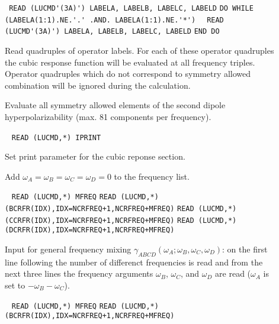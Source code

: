 \begin{description}
\item[] \verb| |\newline
\verb|READ (LUCMD'(3A)') LABELA, LABELB, LABELC, LABELD|\newline
\verb|DO WHILE (LABELA(1:1).NE.'.' .AND. LABELA(1:1).NE.'*')|\newline
\verb|  READ (LUCMD'(3A)') LABELA, LABELB, LABELC, LABELD|\newline
\verb|END DO|

Read quadruples of operator labels.
For each of these operator quadruples the cubic response
function will be evaluated at all frequency triples.
Operator quadruples which do not correspond to symmetry allowed
combination will be ignored during the calculation. 

\item[] 
Evaluate all symmetry allowed elements of the second dipole
hyperpolarizability (max. 81 components per frequency).

\item[] \verb| |\newline
\verb|READ (LUCMD,*) IPRINT|

Set print parameter for the cubic reponse section.

\item[] 
Add $\omega_A = \omega_B = \omega_C = \omega_D = 0$ to the frequency list.

\item[] \verb| |\newline
\verb|READ (LUCMD,*) MFREQ|\newline
\verb|READ (LUCMD,*) (BCRFR(IDX),IDX=NCRFREQ+1,NCRFREQ+MFREQ)|\newline
\verb|READ (LUCMD,*) (CCRFR(IDX),IDX=NCRFREQ+1,NCRFREQ+MFREQ)|\newline
\verb|READ (LUCMD,*) (DCRFR(IDX),IDX=NCRFREQ+1,NCRFREQ+MFREQ)|

Input for general frequency mixing
$\gamma_{ABCD}(\omega_A;\omega_B,\omega_C,\omega_D)$: on the first line
following  the number of differenct frequencies
is read and from the next three lines the frequency arguments 
$\omega_B$, $\omega_C$, and $\omega_D$ are read
($\omega_A$ is set to $-\omega_B-\omega_C$).
                                                           
\item[] \verb| |\newline
\verb|READ (LUCMD,*) MFREQ|\newline
\verb|READ (LUCMD,*) (BCRFR(IDX),IDX=NCRFREQ+1,NCRFREQ+MFREQ)|


\end{description}
